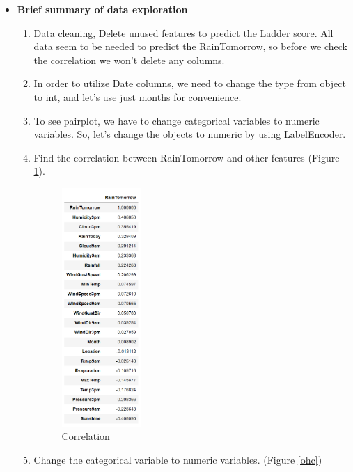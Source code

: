 \documentclass[12pt]{article}
\begin{document}
\begin{itemize}
\item \textbf{Brief summary of data exploration}
    \begin{enumerate}
    \item Data cleaning, Delete unused features to predict the Ladder score. All data seem to be needed to predict the RainTomorrow, so before we check the correlation we won't delete any columns.
    \item In order to utilize Date columns, we need to change the type from object to int, and let's use just months for convenience.
    \item To see pairplot, we have to change categorical variables to numeric variables. So, let's change the objects to numeric by using LabelEncoder.
    \item Find the correlation between RainTomorrow and other features (Figure \ref{corr}). 
    
    \begin{figure}[h!]
      \centering
      \includegraphics[width=0.3\textwidth]{figures/corr.png}
      \caption{Correlation}\label{corr}
    \end{figure}

    
    \item Change the categorical variable to numeric variables. (Figure \ref{ohc})
    


\end{enumerate}
\end{itemize}
\end{document}
